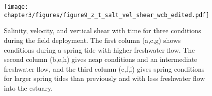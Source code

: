 \begin{figure}
\texttt{[image: chapter3/figures/figure9\_z\_t\_salt\_vel\_shear\_wcb\_edited.pdf]}
\protect\caption{Salinity, velocity, and vertical shear with time for three conditions
during the field deployment. The first column (a,c,g) shows conditions
during a spring tide with higher freshwater flow. The second column
(b,e,h) gives neap conditions and an intermediate freshwater flow,
and the third column (c,f,i) gives spring conditions for larger spring
tides than previously and with less freshwater flow into the estuary.
\label{f11_SUtz}}
\end{figure}


